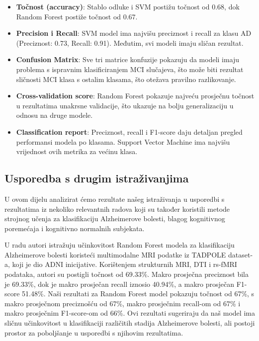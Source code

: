 \documentclass[zavrsnirad]{fer}
\begin{document}
\begin{itemize}
	\item \textbf{Točnost (accuracy)}: Stablo odluke i SVM postižu točnost od 0.68, dok Random Forest postiže točnost od 0.67.
	\item \textbf{Precision i Recall}: SVM model ima najvišu preciznost i recall za klasu AD (Preciznost: 0.73, Recall: 0.91). Međutim, svi modeli imaju sličan rezultat.
    \item \textbf{Confusion Matrix}: Sve tri matrice konfuzije pokazuju da modeli imaju problema s ispravnim klasificiranjem MCI slučajeva, što može biti rezultat sličnosti MCI klasa s ostalim klasama, što otežava pravilno razlikovanje.
    \item \textbf{Cross-validation score}: Random Forest pokazuje najveću prosječnu točnost u rezultatima unakrsne validacije, što ukazuje na bolju generalizaciju u odnosu na druge modele.
    \item \textbf{Classification report}: Preciznost, recall i F1-score daju detaljan pregled performansi modela po klasama. Support Vector Machine ima najvišu vrijednost ovih metrika za većinu klasa.
\end{itemize}


\subsection{Usporedba s drugim istraživanjima}

U ovom dijelu analizirat ćemo rezultate našeg istraživanja u usporedbi s rezultatima iz nekoliko relevantnih radova koji su također koristili metode strojnog učenja za klasifikaciju Alzheimerove bolesti, blagog kognitivnog poremećaja i kognitivno normalnih subjekata.

U radu \cite{MultimodalRF} autori istražuju učinkovitost Random Forest modela za klasifikaciju Alzheimerove bolesti koristeći multimodalne MRI podatke iz TADPOLE dataset-a, koji je dio ADNI inicijative. Korištenjem strukturnih MRI, DTI i rs-fMRI podataka, autori su postigli točnost od 69.33\%. Makro prosječna preciznost bila je 69.33\%, dok je makro prosječan recall iznosio 40.94\%, a makro prosječan F1-score 51.48\%. Naši rezultati za Random Forest model pokazuju točnost od 67\%, s makro prosječnom preciznošću od 67\%, makro prosječnim recall-om od 67\% i makro prosječnim F1-score-om od 66\%. Ovi rezultati sugeriraju da naš model ima sličnu učinkovitost u klasifikaciji različitih stadija Alzheimerove bolesti, ali postoji prostor za poboljšanje u usporedbi s njihovim rezultatima.
\end{document}
